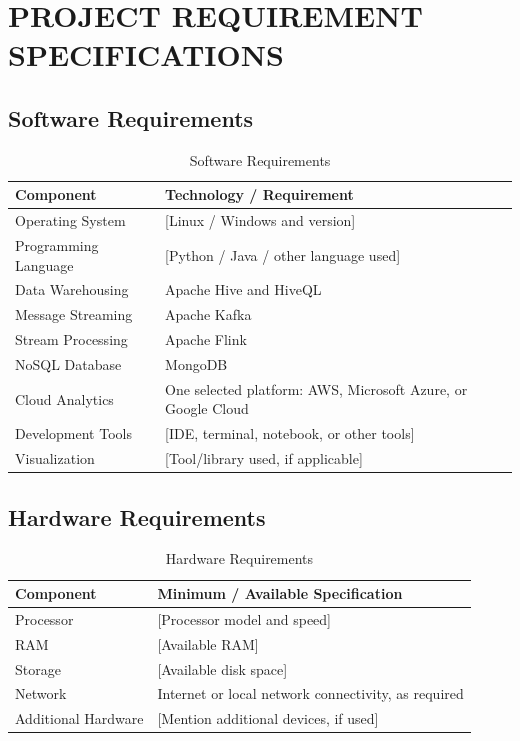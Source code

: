 \documentclass[12pt,a4paper]{report}
\begin{document}
\chapter{PROJECT REQUIREMENT SPECIFICATIONS}

\section{Software Requirements}
\begin{table}[H]
\centering
\caption{Software Requirements}
\begin{tabularx}{\textwidth}{|l|X|}
\hline
\textbf{Component} & \textbf{Technology / Requirement}\\
\hline
Operating System & [Linux / Windows and version]\\
\hline
Programming Language & [Python / Java / other language used]\\
\hline
Data Warehousing & Apache Hive and HiveQL\\
\hline
Message Streaming & Apache Kafka\\
\hline
Stream Processing & Apache Flink\\
\hline
NoSQL Database & MongoDB\\
\hline
Cloud Analytics & One selected platform: AWS, Microsoft Azure, or Google Cloud\\
\hline
Development Tools & [IDE, terminal, notebook, or other tools]\\
\hline
Visualization & [Tool/library used, if applicable]\\
\hline
\end{tabularx}
\end{table}

\section{Hardware Requirements}
\begin{table}[H]
\centering
\caption{Hardware Requirements}
\begin{tabularx}{\textwidth}{|l|X|}
\hline
\textbf{Component} & \textbf{Minimum / Available Specification}\\
\hline
Processor & [Processor model and speed]\\
\hline
RAM & [Available RAM]\\
\hline
Storage & [Available disk space]\\
\hline
Network & Internet or local network connectivity, as required\\
\hline
Additional Hardware & [Mention additional devices, if used]\\
\hline
\end{tabularx}
\end{table}
\end{document}

